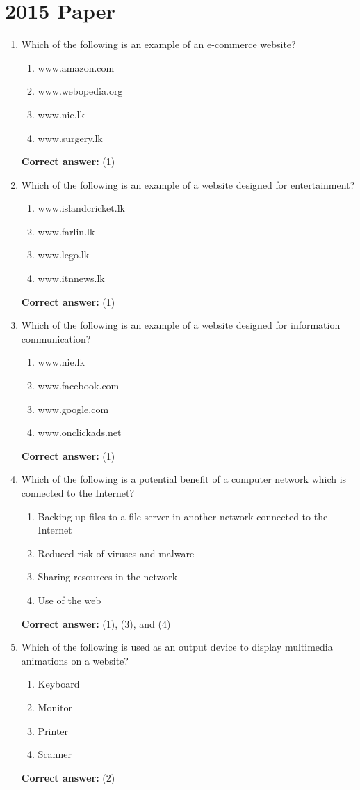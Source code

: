 \documentclass[12pt]{article}
\begin{document}
\section*{2015 Paper}
\begin{enumerate}[label=Q\arabic*:,leftmargin=*,resume]
\item Which of the following is an example of an e-commerce website?\\
\begin{enumerate}[label=(\arabic*)]
\item www.amazon.com
\item www.webopedia.org
\item www.nie.lk
\item www.surgery.lk
\end{enumerate}
\textbf{Correct answer:} (1)

\item Which of the following is an example of a website designed for entertainment?\\
\begin{enumerate}[label=(\arabic*)]
\item www.islandcricket.lk
\item www.farlin.lk
\item www.lego.lk
\item www.itnnews.lk
\end{enumerate}
\textbf{Correct answer:} (1)

\item Which of the following is an example of a website designed for information communication?\\
\begin{enumerate}[label=(\arabic*)]
\item www.nie.lk
\item www.facebook.com
\item www.google.com
\item www.onclickads.net
\end{enumerate}
\textbf{Correct answer:} (1)

\item Which of the following is a potential benefit of a computer network which is connected to the Internet?\\
\begin{enumerate}[label=(\arabic*)]
\item Backing up files to a file server in another network connected to the Internet
\item Reduced risk of viruses and malware
\item Sharing resources in the network
\item Use of the web
\end{enumerate}
\textbf{Correct answer:} (1), (3), and (4)

\item Which of the following is used as an output device to display multimedia animations on a website?\\
\begin{enumerate}[label=(\arabic*)]
\item Keyboard
\item Monitor
\item Printer
\item Scanner
\end{enumerate}
\textbf{Correct answer:} (2)
\end{enumerate}
\end{document}
